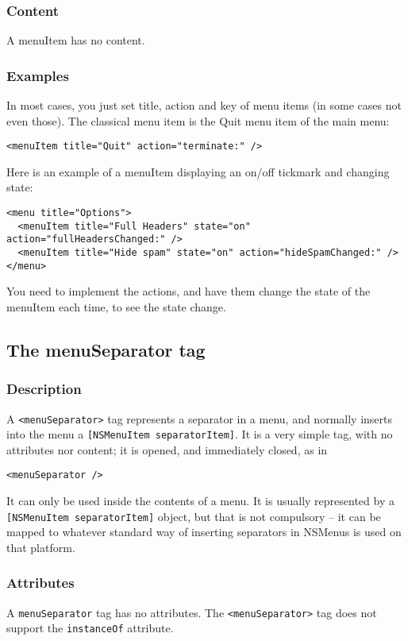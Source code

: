 \subsubsection{Content}
A menuItem has no content.

\subsubsection{Examples}
In most cases, you just set title, action and key of menu items (in
some cases not even those).  The classical menu item is the Quit menu
item of the main menu:
\begin{verbatim}
<menuItem title="Quit" action="terminate:" />
\end{verbatim}
Here is an example of a menuItem displaying an on/off tickmark and
changing state:
\begin{verbatim}
<menu title="Options">
  <menuItem title="Full Headers" state="on" action="fullHeadersChanged:" />
  <menuItem title="Hide spam" state="on" action="hideSpamChanged:" />
</menu>
\end{verbatim}
You need to implement the actions, and have them change the state of the
menuItem each time, to see the state change.

\subsection{The menuSeparator tag}

\subsubsection{Description}
A \texttt{<menuSeparator>} tag represents a separator in a menu, and
normally inserts into the menu a \texttt{[NSMenuItem separatorItem]}.
It is a very simple tag, with no attributes nor content; it is opened,
and immediately closed, as in
\begin{verbatim}
<menuSeparator />
\end{verbatim}
It can only be used inside the contents of a menu.  It is usually
represented by a \texttt{[NSMenuItem separatorItem]} object, but that
is not compulsory -- it can be mapped to whatever standard way of
inserting separators in NSMenus is used on that platform.

\subsubsection{Attributes}
A \texttt{menuSeparator} tag has no attributes.  The
\texttt{<menuSeparator>} tag does not support the \texttt{instanceOf}
attribute.

